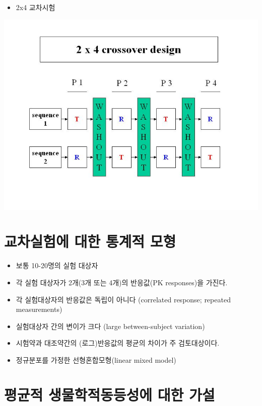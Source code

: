 \documentclass[
]{book}
\providecommand{\tightlist}{%
  \setlength{\itemsep}{0pt}\setlength{\parskip}{0pt}}
\begin{document}
\begin{itemize}
\tightlist
\item
  2x4 교차시험
\end{itemize}

\includegraphics{design24.jpg}

\hypertarget{uxad50uxcc28uxc2e4uxd5d8uxc5d0-uxb300uxd55c-uxd1b5uxacc4uxc801-uxbaa8uxd615}{%
\section{교차실험에 대한 통계적 모형}\label{uxad50uxcc28uxc2e4uxd5d8uxc5d0-uxb300uxd55c-uxd1b5uxacc4uxc801-uxbaa8uxd615}}

\begin{itemize}
\item
  보통 10-20명의 실험 대상자
\item
  각 실험 대상자가 2개(3개 또는 4개)의 반응값(PK responses)을 가진다.
\item
  각 실험대상자의 반응값은 독립이 아니다 (correlated response; repeated measurements)
\item
  실험대상자 간의 변이가 크다 (large between-subject variation)
\item
  시험약과 대조약간의 (로그)반응값의 평균의 차이가 주 검토대상이다.
\item
  정규분포를 가정한 선형혼합모형(linear mixed model)
\end{itemize}

\hypertarget{uxd3c9uxade0uxc801-uxc0dduxbb3cuxd559uxc801uxb3d9uxb4f1uxc131uxc5d0-uxb300uxd55c-uxac00uxc124}{%
\section{평균적 생물학적동등성에 대한 가설}\label{uxd3c9uxade0uxc801-uxc0dduxbb3cuxd559uxc801uxb3d9uxb4f1uxc131uxc5d0-uxb300uxd55c-uxac00uxc124}}
\end{document}
